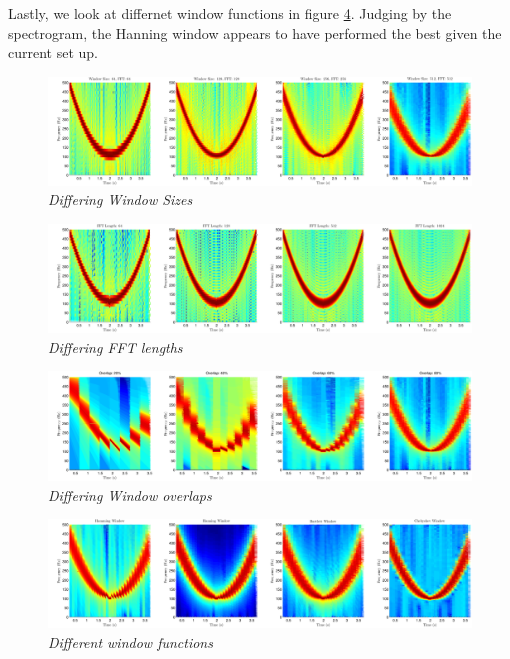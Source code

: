 \documentclass[./main.tex]{subfiles}
\begin{document}
Lastly, we look at differnet window functions in figure \ref{fig:2_3_a_windows}. Judging by the spectrogram, the Hanning window appears to have performed the best given the current set up. 

\begin{figure}[h]
	\centering 
	\includegraphics[scale=0.45]{fig/2/2_3_a_window_size.pdf}
	\caption{\textit{Differing Window Sizes}}
	\label{fig:2_3_a_window_size}
\end{figure}

\begin{figure}[h]
	\centering 
	\includegraphics[scale=0.45]{fig/2/2_3_a_fft_len.pdf}
	\caption{\textit{Differing FFT lengths}}
	\label{fig:2_3_a_fft_len}
\end{figure}

\begin{figure}[h]
	\centering 
	\includegraphics[scale=0.45]{fig/2/2_3_a_overlap.pdf}
	\caption{\textit{Differing Window overlaps}}
	\label{fig:2_3_a_overlap}
\end{figure}

\begin{figure}[h]
	\centering 
	\includegraphics[scale=0.45]{fig/2/2_3_a_windows.pdf}
	\caption{\textit{Different window functions}}
	\label{fig:2_3_a_windows}
\end{figure}
\end{document}
